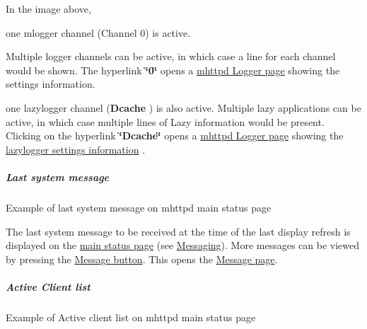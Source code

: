 \par
 In the image above,
\begin{DoxyItemize}
\item one mlogger channel (Channel 0) is active. \par
Multiple logger channels can be active, in which case a line for each channel would be shown. The hyperlink {\bfseries \char`\"{}0\char`\"{}} opens a \hyperlink{RC_mhttpd_Logger_page}{mhttpd Logger page} showing the settings information.
\item one lazylogger channel ({\bfseries Dcache} ) is also active. Multiple lazy applications can be active, in which case multiple lines of Lazy information would be present. Clicking on the hyperlink {\bfseries \char`\"{}Dcache\char`\"{}} opens a \hyperlink{RC_mhttpd_Logger_page}{mhttpd Logger page} showing the \hyperlink{RC_mhttpd_Logger_page_RC_mhttpd_Logger_lazylogger}{lazylogger settings information} .
\end{DoxyItemize}

\par


\par
 \label{RC_mhttpd_status_page_features_idx_message_last}
\hypertarget{RC_mhttpd_status_page_features_idx_message_last}{}
 \hypertarget{RC_mhttpd_status_page_features_RC_mhttpd_status_latest_msg}{}\subparagraph{Last system message}\label{RC_mhttpd_status_page_features_RC_mhttpd_status_latest_msg}
\begin{center} Example of last system message on mhttpd main status page \par
\par
\par
  \end{center}  \par


The last system message to be received at the time of the last display refresh is displayed on the \hyperlink{RC_mhttpd_Main_Status_page_RC_mhttpd_main_status}{main status page} (see \hyperlink{F_Messaging}{Messaging}). More messages can be viewed by pressing the \hyperlink{RC_mhttpd_status_page_features_RC_mhttpd_status_Page_buttons}{Message button}. This opens the \hyperlink{RC_mhttpd_Message_page}{Message page}.

\par


\par


\label{RC_mhttpd_status_page_features_idx_clients_active_mhttpd}
\hypertarget{RC_mhttpd_status_page_features_idx_clients_active_mhttpd}{}
 \hypertarget{RC_mhttpd_status_page_features_RC_mhttpd_status_clients}{}\subparagraph{Active Client list}\label{RC_mhttpd_status_page_features_RC_mhttpd_status_clients}
\begin{center} Example of Active client list on mhttpd main status page \par
\par
\par
  \end{center}  \par


